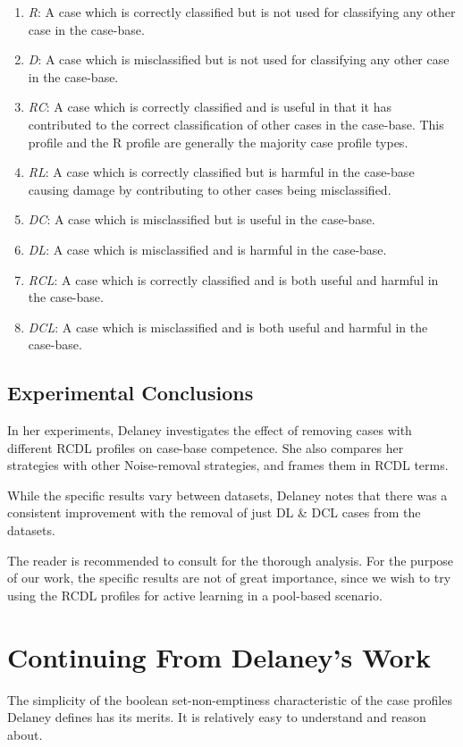 \documentclass[a4paper,11pt]{report}
\begin{document}
\begin{enumerate}
	\item \emph{R}: A case which is correctly classified but is not used for classifying any other case in the case-base.
	\item \emph{D}: A case which is misclassified but is not used for classifying any other case in the case-base.
	\item \emph{RC}: A case which is correctly classified and is useful in that it has contributed to the correct classification of other cases in the case-base. This profile and the R profile are generally the majority case profile types.
	\item \emph{RL}: A case which is correctly classified but is harmful in the case-base causing damage by contributing to other cases being misclassified.
	\item \emph{DC}: A case which is misclassified but is useful in the case-base. 
	\item \emph{DL}: A case which is misclassified and is harmful in the case-base.
	\item \emph{RCL}: A case which is correctly classified and is both useful and harmful in the case-base.
	\item \emph{DCL}: A case which is misclassified and is both useful and harmful in the case-base.
\end{enumerate}


\subsection{Experimental Conclusions}
In her experiments, Delaney investigates the effect of removing cases with different RCDL profiles on case-base competence. She also compares her strategies with other Noise-removal strategies, and frames them in RCDL terms.

While the specific results vary between datasets, Delaney notes that there was a consistent improvement with the removal of just DL \& DCL cases from the datasets. 

The reader is recommended to consult \citet{Delany2009} for the thorough analysis. For the purpose of our work, the specific results are not of great importance, since we wish to try using the RCDL profiles for active learning in a pool-based scenario.

\section{Continuing From Delaney's Work}
The simplicity of the boolean set-non-emptiness characteristic of the case profiles Delaney defines has its merits. It is relatively easy to understand and reason about. 
\end{document}

